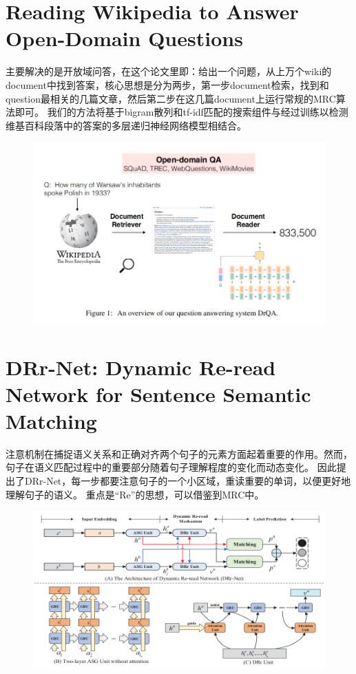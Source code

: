 \documentclass[a4paper,UTF8]{article}
\numberwithin{equation}{section}
\begin{document}
\section{Reading Wikipedia to Answer Open-Domain Questions}
主要解决的是开放域问答，在这个论文里即：给出一个问题，从上万个wiki的document中找到答案，核心思想是分为两步，第一步document检索，找到和question最相关的几篇文章，然后第二步在这几篇document上运行常规的MRC算法即可。
我们的方法将基于bigram散列和tf-idf匹配的搜索组件与经过训练以检测维基百科段落中的答案的多层递归神经网络模型相结合。
\begin{figure}[H]
	\centering
	\includegraphics[width=\textwidth]{8-1.png}
\end{figure}
\newpage
\section{DRr-Net: Dynamic Re-read Network for Sentence Semantic Matching}
注意机制在捕捉语义关系和正确对齐两个句子的元素方面起着重要的作用。然而，句子在语义匹配过程中的重要部分随着句子理解程度的变化而动态变化。
因此提出了DRr-Net，每一步都要注意句子的一个小区域，重读重要的单词，以便更好地理解句子的语义。
重点是“Re”的思想，可以借鉴到MRC中。
\begin{figure}[H]
	\centering
	\includegraphics[width=\textwidth]{9-1.png}
\end{figure}
\end{document}
